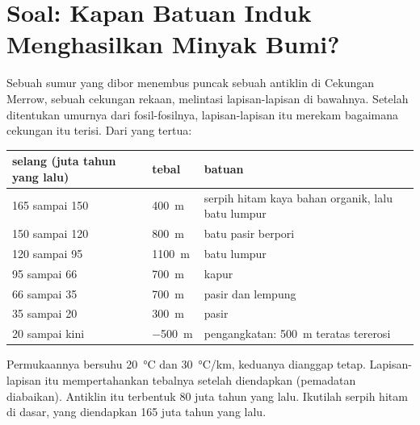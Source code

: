 \section{Soal: Kapan Batuan Induk Menghasilkan Minyak Bumi?}

\begin{problem}
\label{pb:g11:fossil-fuel-geology:1}
Sebuah sumur yang dibor menembus puncak sebuah antiklin di Cekungan Merrow,
sebuah cekungan rekaan, melintasi lapisan-lapisan di bawahnya. Setelah
ditentukan umurnya dari fosil-fosilnya, lapisan-lapisan itu merekam bagaimana
cekungan itu terisi. Dari yang tertua:
\begin{center}
\small
\begin{tabular}{|l|l|l|}
\hline
\textbf{selang (juta tahun yang lalu)} & \textbf{tebal} & \textbf{batuan} \\
\hline
165 sampai 150 & \qty{400}{m} & serpih hitam kaya bahan organik, lalu batu lumpur \\
150 sampai 120 & \qty{800}{m} & batu pasir berpori \\
120 sampai 95 & \qty{1100}{m} & batu lumpur \\
95 sampai 66 & \qty{700}{m} & kapur \\
66 sampai 35 & \qty{700}{m} & pasir dan lempung \\
35 sampai 20 & \qty{300}{m} & pasir \\
20 sampai kini & \qty{-500}{m} & pengangkatan: \qty{500}{m} teratas tererosi \\
\hline
\end{tabular}
\end{center}
Permukaannya bersuhu \qty{20}{\degreeCelsius} dan 
\qty{30}{\degreeCelsius/km}, keduanya dianggap tetap. Lapisan-lapisan itu
mempertahankan tebalnya setelah diendapkan (pemadatan diabaikan). Antiklin itu
terbentuk 80 juta tahun yang lalu. Ikutilah serpih hitam di dasar, yang
diendapkan 165 juta tahun yang lalu.


\end{problem}
